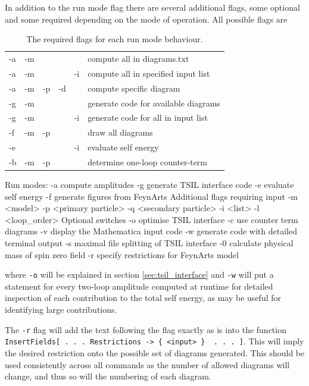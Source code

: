 In addition to the run mode flag there are several additional flags, some optional and some required depending on the mode of operation.  All possible flags are
\begin{table}
\caption{The required flags for each run mode behaviour.}
\begin{tabular}{l c c c c l} 
\hline
-a & -m & & & &compute all in diagrams.txt \\
-a & -m &  && -i&compute all in specified input list\\
-a & -m & -p & -d && compute specific diagram\\
-g & -m & & &  &generate code for available diagrams\\
-g & -m &  & & -i &generate code for all in input list\\
-f & -m & -p & & &draw all diagrams\\
-e &  & & & -i&evaluate self energy\\
-b & -m & -p & & &determine one-loop counter-term\\
\hline\end{tabular}
\end{table}
\begin{lstterm}
Run modes:
-a 		compute amplitudes
-g		generate TSIL interface code
-e		evaluate self energy
-f		generate figures from FeynArts
Additional flags requiring input
-m <model> 
-p <primary particle>
-q <secondary particle>
-i  <list>
-l <loop_order>
Optional switches
-o		optimise TSIL interface
-c		use counter term diagrams
-v		display the Mathematica input code
-w		generate code with detailed terminal output
-s		maximal file splitting of TSIL interface
-0		calculate physical mass of spin zero field
-r		specify restrictions for FeynArts model
\end{lstterm}
where \lstinline{-o} will be explained in section \ref{sec:tsil_interface} and \lstinline{-w} will put a  statement for every two-loop amplitude computed at runtime for detailed inspection of each contribution to the total self energy, as may be useful for identifying large contributions.

The \lstinline{-r} flag will add the text following the flag exactly as is into the \feynarts function \lstinline|InsertFields[ . . . Restrictions -> { <input> }  . . . ]|.  This will imply the desired restriction onto the possible set of diagrams generated.  This should be used consistently across all commands as the number of allowed diagrams will change, and thus so will the numbering of each diagram.


